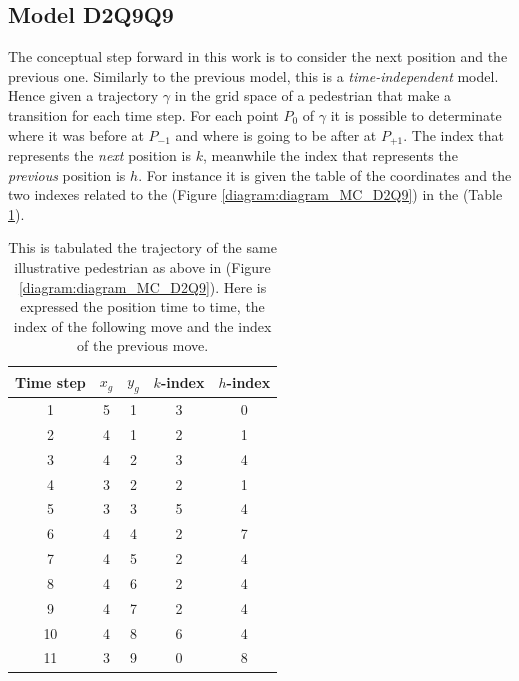 \documentclass[class=article, crop=false]{standalone}
\begin{document}
\FloatBarrier
\newpage
\subsection{Model D2Q9Q9}
The conceptual step forward in this work is to consider the next position and the previous one.
Similarly to the previous model, this is a \emph{time-independent} model.
Hence given a trajectory $\gamma$ in the grid space of a pedestrian that make a transition for each time step.
For each point $P_0$ of $\gamma$ it is possible to determinate where it was before at $P_{-1}$ and where is going to be after at $P_{+1}$.
The index that represents the \emph{next} position is $k$, meanwhile the index that represents the \emph{previous} position is $h$.
For instance it is given the table of the coordinates and the two indexes related to the (Figure \ref{diagram:diagram_MC_D2Q9}) in the (Table \ref{table:diagram_MC_D2Q9}).
\begin{table}[h!]
\centering
\begin{tabular}{|c|c|c|c|c|}
\hline
Time step & $x_g$ & $y_g$ & $k$-index & $h$-index  \\ \hline
1         & 5 & 1 & 3 & 0 \\ \hline
2         & 4 & 1 & 2 & 1 \\ \hline
3         & 4 & 2 & 3 & 4 \\ \hline
4         & 3 & 2 & 2 & 1 \\ \hline
5         & 3 & 3 & 5 & 4 \\ \hline
6         & 4 & 4 & 2 & 7 \\ \hline
7         & 4 & 5 & 2 & 4 \\ \hline
8         & 4 & 6 & 2 & 4 \\ \hline
9         & 4 & 7 & 2 & 4 \\ \hline
10        & 4 & 8 & 6 & 4 \\ \hline
11        & 3 & 9 & 0 & 8 \\ \hline
\end{tabular}
\captionsetup{width=.6\linewidth}
\caption{This is tabulated the trajectory of the same illustrative pedestrian as above in (Figure \ref{diagram:diagram_MC_D2Q9}).
Here is expressed the position time to time, the index of the following move and the index of the previous move.}
\label{table:diagram_MC_D2Q9}
\end{table}
\end{document}
